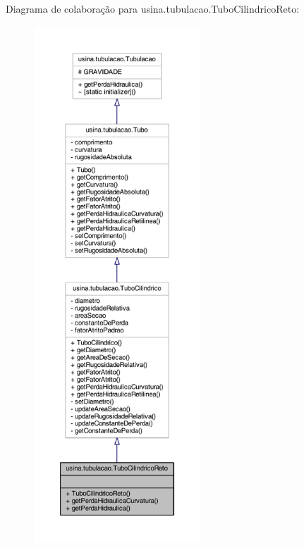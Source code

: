 Diagrama de colaboração para usina.\-tubulacao.\-Tubo\-Cilindrico\-Reto\-:\nopagebreak
\begin{figure}[H]
\begin{center}
\leavevmode
\includegraphics[height=550pt]{classusina_1_1tubulacao_1_1_tubo_cilindrico_reto__coll__graph}
\end{center}
\end{figure}
